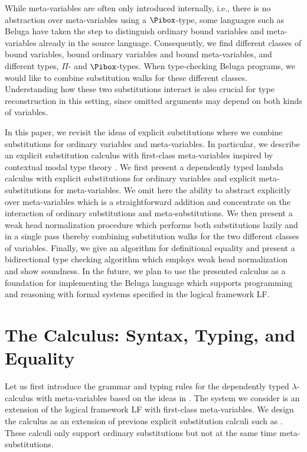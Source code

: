 \documentclass[copyright,creativecommons]{eptcs}
\begin{document}
While meta-variables are often only introduced internally, i.e., there
is no abstraction over meta-variables using a $\Pibox$-type, some
languages such as Beluga have taken the step to distinguish ordinary
bound variables and meta-variables already in the source
language. Consequently, we find different classes of bound variables,
bound ordinary variables and bound meta-variables, and different
types, $\Pi$- and $\Pibox$-types. When 
type-checking Beluga programs, we would like to combine substitution
walks for these different classes. Understanding how these two
substitutions interact is also crucial for type reconstruction in this
setting, since omitted arguments may depend on both kinds of variables.

In this paper, we revisit the ideas of explicit substitutions where we
combine substitutions for ordinary variables and meta-variables. In
particular, we describe an explicit substitution calculus with
first-class meta-variables inspired by contextual modal type theory
\cite{Nanevski:ICML05}. We first present a dependently typed lambda
calculus with explicit substitutions for  ordinary variables and
explicit meta-substitutions for meta-variables. We omit here the
ability to abstract explicitly over meta-variables which is a
straightforward addition and concentrate on the interaction of
ordinary substitutions and meta-substitutions. We then present a weak
head normalization procedure which performs both substitutions lazily
and in a single pass thereby combining substitution walks for 
the two different classes of variables. Finally, we give an algorithm
for definitional equality and present a bidirectional type checking
algorithm which employs weak head normalization and show soundness. 
In the future, we plan to use the presented calculus as a
foundation for implementing the Beluga language which supports
programming and reasoning with formal systems specified in the logical
framework LF. 


\section{The Calculus: Syntax, Typing, and Equality}

Let us first introduce the grammar and typing rules for the
dependently typed $\lambda$-calculus  with meta-variables based on
the ideas in \cite{Nanevski:ICML05}. The system we consider
is an extension of the logical framework LF with first-class
meta-variables. We design the calculus 
as an extension of previous explicit substitution calculi such as
\cite{abadiCardelliCurienLevy:jfp91,dowekHardinKirchner:infcomp00}. These calculi only support ordinary
substitutions but not at the same time meta-substitutions. 
\end{document}
